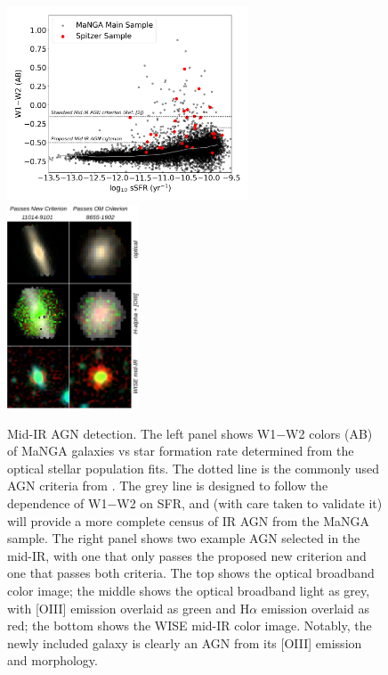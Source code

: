 \documentclass[12pt, preprint]{hacked-aastex}
\begin{document}
\begin{figure}[t!]
\includegraphics[width=0.64\textwidth]{w1w2-vs-ssfr.png}
\includegraphics[width=0.35\textwidth]{ir-grid.drawio.png}
  \vspace{-22pt}
    \caption{
\label{fig:wise} \small Mid-IR AGN detection. 
The left panel shows W1$-$W2 colors (AB) of MaNGA galaxies vs star
formation rate determined from the optical stellar population fits.
The dotted line is the commonly used AGN criteria from
\cite{assef18a}. The grey line is designed to follow the dependence
of W1$-$W2 on SFR, and (with care taken to validate it) will provide
a more complete census of IR AGN from the MaNGA sample. The right
panel shows two example AGN selected in the mid-IR, with one that
only passes the proposed new criterion and one that passes both 
criteria. The top shows the optical broadband color image; the middle shows 
the optical broadband light as grey, with [OIII] emission overlaid
as green and H$\alpha$ emission overlaid as red; the bottom shows
the WISE mid-IR color image. Notably, the newly included galaxy
is clearly an AGN from its [OIII] emission and morphology.}
\end{figure}
\end{document}
